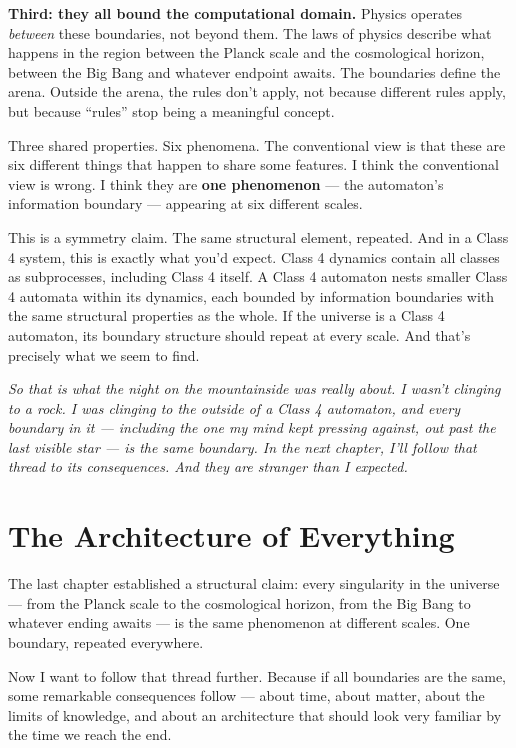 \documentclass[11pt, twoside, openright]{book}
\begin{document}
\textbf{Third: they all bound the computational domain.} Physics operates \textit{between} these boundaries, not beyond them. The laws of physics describe what happens in the region between the Planck scale and the cosmological horizon, between the Big Bang and whatever endpoint awaits. The boundaries define the arena. Outside the arena, the rules don't apply, not because different rules apply, but because ``rules'' stop being a meaningful concept.

Three shared properties. Six phenomena. The conventional view is that these are six different things that happen to share some features. I think the conventional view is wrong. I think they are \textbf{one phenomenon} --- the automaton's information boundary --- appearing at six different scales.

This is a symmetry claim. The same structural element, repeated. And in a Class 4 system, this is exactly what you'd expect. Class 4 dynamics contain all classes as subprocesses, including Class 4 itself. A Class 4 automaton nests smaller Class 4 automata within its dynamics, each bounded by information boundaries with the same structural properties as the whole. If the universe is a Class 4 automaton, its boundary structure should repeat at every scale. And that's precisely what we seem to find.


\textit{So that is what the night on the mountainside was really about. I wasn't clinging to a rock. I was clinging to the outside of a Class 4 automaton, and every boundary in it --- including the one my mind kept pressing against, out past the last visible star --- is the same boundary. In the next chapter, I'll follow that thread to its consequences. And they are stranger than I expected.}


\chapter{The Architecture of Everything}

The last chapter established a structural claim: every singularity in the universe --- from the Planck scale to the cosmological horizon, from the Big Bang to whatever ending awaits --- is the same phenomenon at different scales. One boundary, repeated everywhere.

Now I want to follow that thread further. Because if all boundaries are the same, some remarkable consequences follow --- about time, about matter, about the limits of knowledge, and about an architecture that should look very familiar by the time we reach the end.
\end{document}
